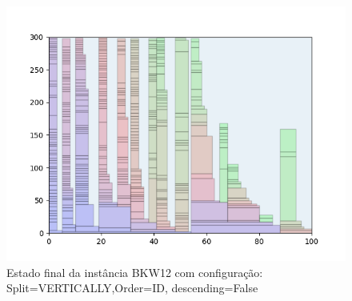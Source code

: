 \begin{figure}[H]
    \centering
    \caption[]{Estado final da instância BKW12 com configuração: Split=VERTICALLY,Order=ID, descending=False}
    \label{fig:bkw12-vertically-id-false}
    \includegraphics[scale=0.5]{output/figures/bkw/bkw12/vertically/id/false/000}
\end{figure}